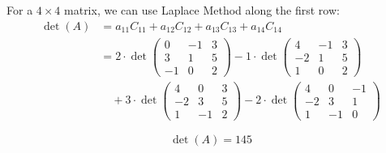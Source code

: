 For a \(4 \times 4\) matrix, we can use Laplace Method along the first row:
\begin{align*}
\det(A) &= a_{11}C_{11} + a_{12}C_{12} + a_{13}C_{13} + a_{14}C_{14} \\
&= 2 \cdot \det\begin{pmatrix} 0 & -1 & 3 \\ 3 & 1 & 5 \\ -1 & 0 & 2 \end{pmatrix} 
- 1 \cdot \det\begin{pmatrix} 4 & -1 & 3 \\ -2 & 1 & 5 \\ 1 & 0 & 2 \end{pmatrix} \\
&\quad + 3 \cdot \det\begin{pmatrix} 4 & 0 & 3 \\ -2 & 3 & 5 \\ 1 & -1 & 2 \end{pmatrix} 
- 2 \cdot \det\begin{pmatrix} 4 & 0 & -1 \\ -2 & 3 & 1 \\ 1 & -1 & 0 \end{pmatrix}
\end{align*}

\[\det(A) = 145\]

\newpage
